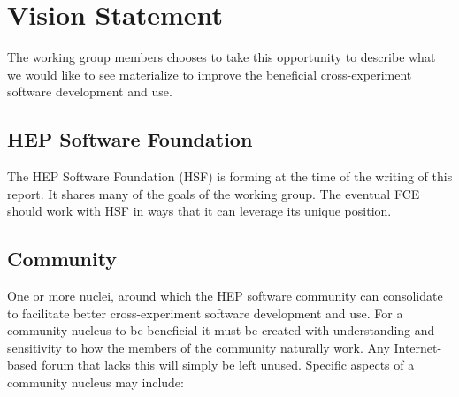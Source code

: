 \section{Vision Statement}

The working group members chooses to take this opportunity to describe
what we would like to see materialize to improve the beneficial
cross-experiment software development and use.

\subsection{HEP Software Foundation}

The HEP Software Foundation\cite{hsfwhitepaper} (HSF) is forming at
the time of the writing of this report.  It shares many of the goals
of the working group.  The eventual FCE should work with HSF in ways
that it can leverage its unique position.  

\subsection{Community}

One or more nuclei, around which the HEP software community can
consolidate to facilitate better cross-experiment software development
and use.  For a community nucleus to be beneficial it must be created
with understanding and sensitivity to how the members of the community
naturally work.  Any Internet-based forum that lacks this will simply
be left unused.  Specific aspects of a community nucleus may include:

